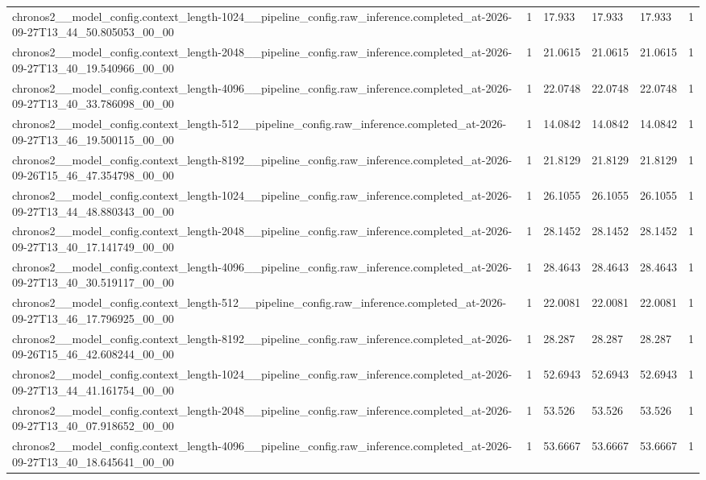 \begin{tabular}{llllll}
chronos2\_\_model\_config.context\_length-1024\_\_pipeline\_config.raw\_inference.completed\_at-2026-09-27T13\_44\_50.805053\_00\_00 & 1 & 17.933 & 17.933 & 17.933 & 1 \\
chronos2\_\_model\_config.context\_length-2048\_\_pipeline\_config.raw\_inference.completed\_at-2026-09-27T13\_40\_19.540966\_00\_00 & 1 & 21.0615 & 21.0615 & 21.0615 & 1 \\
chronos2\_\_model\_config.context\_length-4096\_\_pipeline\_config.raw\_inference.completed\_at-2026-09-27T13\_40\_33.786098\_00\_00 & 1 & 22.0748 & 22.0748 & 22.0748 & 1 \\
chronos2\_\_model\_config.context\_length-512\_\_pipeline\_config.raw\_inference.completed\_at-2026-09-27T13\_46\_19.500115\_00\_00 & 1 & 14.0842 & 14.0842 & 14.0842 & 1 \\
chronos2\_\_model\_config.context\_length-8192\_\_pipeline\_config.raw\_inference.completed\_at-2026-09-26T15\_46\_47.354798\_00\_00 & 1 & 21.8129 & 21.8129 & 21.8129 & 1 \\
chronos2\_\_model\_config.context\_length-1024\_\_pipeline\_config.raw\_inference.completed\_at-2026-09-27T13\_44\_48.880343\_00\_00 & 1 & 26.1055 & 26.1055 & 26.1055 & 1 \\
chronos2\_\_model\_config.context\_length-2048\_\_pipeline\_config.raw\_inference.completed\_at-2026-09-27T13\_40\_17.141749\_00\_00 & 1 & 28.1452 & 28.1452 & 28.1452 & 1 \\
chronos2\_\_model\_config.context\_length-4096\_\_pipeline\_config.raw\_inference.completed\_at-2026-09-27T13\_40\_30.519117\_00\_00 & 1 & 28.4643 & 28.4643 & 28.4643 & 1 \\
chronos2\_\_model\_config.context\_length-512\_\_pipeline\_config.raw\_inference.completed\_at-2026-09-27T13\_46\_17.796925\_00\_00 & 1 & 22.0081 & 22.0081 & 22.0081 & 1 \\
chronos2\_\_model\_config.context\_length-8192\_\_pipeline\_config.raw\_inference.completed\_at-2026-09-26T15\_46\_42.608244\_00\_00 & 1 & 28.287 & 28.287 & 28.287 & 1 \\
chronos2\_\_model\_config.context\_length-1024\_\_pipeline\_config.raw\_inference.completed\_at-2026-09-27T13\_44\_41.161754\_00\_00 & 1 & 52.6943 & 52.6943 & 52.6943 & 1 \\
chronos2\_\_model\_config.context\_length-2048\_\_pipeline\_config.raw\_inference.completed\_at-2026-09-27T13\_40\_07.918652\_00\_00 & 1 & 53.526 & 53.526 & 53.526 & 1 \\
chronos2\_\_model\_config.context\_length-4096\_\_pipeline\_config.raw\_inference.completed\_at-2026-09-27T13\_40\_18.645641\_00\_00 & 1 & 53.6667 & 53.6667 & 53.6667 & 1 \\

\end{tabular}
